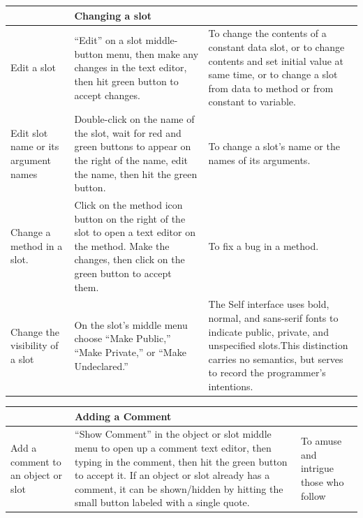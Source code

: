 \documentclass[letterpaper,10pt,english]{sphinxmanual}
\begin{document}
\begin{tabulary}{\linewidth}{p{5cm} p{5cm} p{5cm}}
\hline
 & 
\textbf{Changing a slot}
 & \\\hline

Edit a slot
 & 
“Edit” on a slot middle-button menu, then make any changes in the text editor, then hit green button to accept changes.
 & 
To change the contents of a constant data slot, or to change contents and set initial value at same time, or to change a slot from data to method or from constant to variable.
\\\hline

Edit slot name or its argument names
 & 
Double-click on the name of the slot, wait for red and green buttons to appear on the right of the name, edit the name, then hit the green button.
 & 
To change a slot’s name or the names of its arguments.
\\\hline

Change a method in a slot.
 & 
Click on the method icon button on the right of the slot to open a text editor on the method. Make the changes, then click on the green button to accept them.
 & 
To fix a bug in a method.
\\\hline

Change the visibility of a slot
 & 
On the slot’s middle menu choose “Make Public,” “Make Private,” or “Make Undeclared.”
 & 
The Self interface uses bold, normal, and sans-serif fonts to indicate public, private, and unspecified slots.This distinction carries no semantics, but serves to record the programmer’s intentions.
\\\hline
\end{tabulary}


\begin{tabulary}{\linewidth}{p{5cm} p{5cm} p{5cm}}
\hline
 & 
\textbf{Adding a Comment}
 & \\\hline

Add a comment to an object or slot
 & 
“Show Comment” in the object or slot middle menu to open up a comment text editor, then typing in the comment, then hit the green button to accept it. If an object or slot already has a comment, it can be shown/hidden by hitting the
small button labeled with a single quote.
 & 
To amuse and intrigue those who follow
\\\hline
\end{tabulary}
\end{document}

